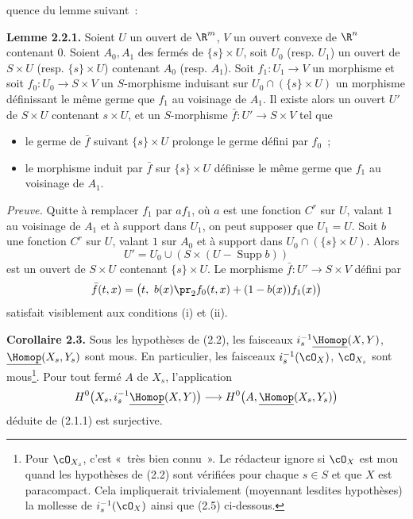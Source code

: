 quence du lemme suivant~:

\textbf{Lemme 2.2.1.} Soient $U$ un ouvert de $\R^m$, $V$ un ouvert convexe de $\R^n$ contenant $0$. Soient $A_0,A_1$ des fermés de $\{s\}\times U$, soit $U_0$ (resp. $U_1$) un ouvert de $S\times U$ (resp. $\{s\}\times U$) contenant $A_0$ (resp. $A_1$). Soit $f_1:U_1\to V$ un morphisme et soit $f_0:U_0\to S\times V$ un $S$-morphisme induisant sur $U_0\cap(\{s\}\times U)$ un morphisme définissant le même germe que $f_1$ au voisinage de $A_1$. Il existe alors un ouvert $U'$ de $S\times U$ contenant $s\times U$, et un $S$-morphisme $\bar f:U'\longrightarrow S\times V$ tel que
\begin{itemize}
\item[(i)] le germe de $\bar f$ suivant $\{s\}\times U$ prolonge le germe défini par $f_0$~;
\item[(ii)] le morphisme induit par $\bar f$ sur $\{s\}\times U$ définisse le même germe que $f_1$ au voisinage de $A_1$.
\end{itemize}

\emph{Preuve.} Quitte à remplacer $f_1$ par $af_1$, où $a$ est une fonction $C^r$ sur $U$, valant $1$ au voisinage de $A_1$ et à support dans $U_1$, on peut supposer que $U_1=U$. Soit $b$ une fonction $C^r$ sur $U$, valant $1$ sur $A_0$ et à support dans $U_0\cap(\{s\}\times U)$. Alors
\[
  U'=U_0\cup(S\times(U-\operatorname{Supp}b))
\]
est un ouvert de $S\times U$ contenant $\{s\}\times U$. Le morphisme $\bar f:U'\to S\times V$ défini par
\[
  \bar f(t,x)=\bigl(t,\ b(x)\pr_2f_0(t,x)+(1-b(x))f_1(x)\bigr)
\]
satisfait visiblement aux conditions (i) et (ii).

\textbf{Corollaire 2.3.} Sous les hypothèses de (2.2), les faisceaux $i_s^{-1}\underline{\Homop}(X,Y)$, $\underline{\Homop}(X_s,Y_s)$ sont mous. En particulier, les faisceaux $i_s^{-1}(\cO_X)$, $\cO_{X_s}$ sont mous\footnote{Pour $\cO_{X_s}$, c'est «~très bien connu~». Le rédacteur ignore si $\cO_X$ est mou quand les hypothèses de (2.2) sont vérifiées pour chaque $s\in S$ et que $X$ est paracompact. Cela impliquerait trivialement (moyennant lesdites hypothèses) la mollesse de $i_s^{-1}(\cO_X)$ ainsi que (2.5) ci-dessous.}. Pour tout fermé $A$ de $X_s$, l'application
\[
  H^0\bigl(X_s,i_s^{-1}\underline{\Homop}(X,Y)\bigr)
  \longrightarrow
  H^0\bigl(A,\underline{\Homop}(X_s,Y_s)\bigr)
\]
déduite de (2.1.1) est surjective.


